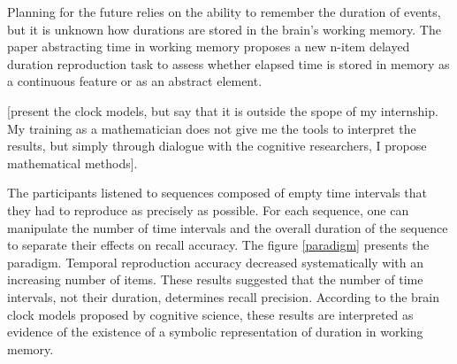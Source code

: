 Planning for the future relies on the ability to remember the duration of events, but it is unknown how durations are stored in the brain's working memory.  The paper abstracting time in working memory proposes a new n-item delayed duration reproduction task to assess whether elapsed time is stored in memory as a continuous feature or as an abstract element. 

[present the clock models, but say that it is outside the spope of my internship. My training as a mathematician does not give me the tools to interpret the results, but simply through dialogue with the cognitive researchers, I propose mathematical methods].

The participants listened to sequences composed of empty time intervals that they had to reproduce as precisely as possible. For each sequence, one can manipulate the number of time intervals and the overall duration of the sequence to separate their effects on recall accuracy. The figure \ref{paradigm} presents the paradigm. Temporal reproduction accuracy decreased systematically with an increasing number of items. These results suggested that the number of time intervals, not their duration, determines recall precision. According to the brain clock models proposed by cognitive science, these results are interpreted as evidence of the existence of a symbolic representation of duration in working memory.



